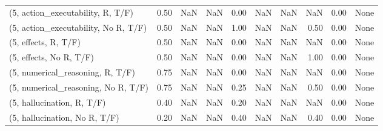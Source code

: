 \begin{table*}[h!]
\begin{adjustbox}{width=2\columnwidth,center}
\begin{tabular}{lrrr|rrr|rrr}
(5, action\_executability, R, T/F)    &                      0.50 &                   NaN &                       NaN &                          0.00 &                       NaN &                           NaN &                                    NaN &                               0.00 &                                  None \\
(5, action\_executability, No R, T/F) &                      0.50 &                   NaN &                       NaN &                          1.00 &                       NaN &                           NaN &                                   0.50 &                               0.00 &                                  None \\
(5, effects, R, T/F)                 &                      0.50 &                   NaN &                       NaN &                          0.00 &                       NaN &                           NaN &                                    NaN &                               0.00 &                                  None \\
(5, effects, No R, T/F)              &                      0.50 &                   NaN &                       NaN &                          0.00 &                       NaN &                           NaN &                                   1.00 &                               0.00 &                                  None \\
(5, numerical\_reasoning, R, T/F)     &                      0.75 &                   NaN &                       NaN &                          0.00 &                       NaN &                           NaN &                                    NaN &                               0.00 &                                  None \\
(5, numerical\_reasoning, No R, T/F)  &                      0.75 &                   NaN &                       NaN &                          0.25 &                       NaN &                           NaN &                                   0.50 &                               0.00 &                                  None \\
(5, hallucination, R, T/F)           &                      0.40 &                   NaN &                       NaN &                          0.20 &                       NaN &                           NaN &                                    NaN &                               0.00 &                                  None \\
(5, hallucination, No R, T/F)        &                      0.20 &                   NaN &                       NaN &                          0.40 &                       NaN &                           NaN &                                   0.40 &                               0.00 &                                  None \\

\end{tabular}
\end{adjustbox}
\end{table*}
